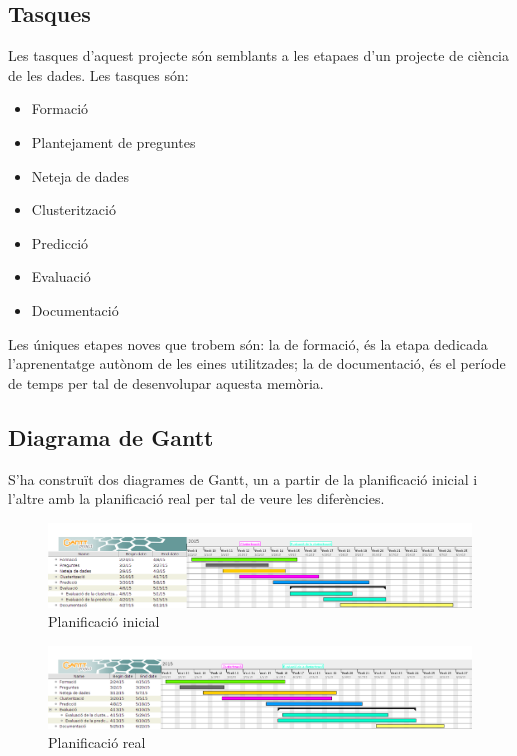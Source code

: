\documentclass[12pt,a4paper,catalan]{article}
\begin{document}
\subsection{Tasques}
Les tasques d'aquest projecte són semblants a les etapaes d'un projecte de ciència de les dades. Les tasques són:
\begin{itemize}[leftmargin=.5in]
	\item Formació
	\item Plantejament de preguntes
	\item Neteja de dades
	\item Clusterització
	\item Predicció
	\item Evaluació
	\item Documentació
\end{itemize}

Les úniques etapes noves que trobem són: la de formació, és la etapa dedicada l'aprenentatge autònom de les eines utilitzades; la de documentació, és el període de temps per tal de desenvolupar aquesta memòria.

\newpage

\subsection{Diagrama de Gantt}
S'ha construït dos diagrames de Gantt, un a partir de la planificació inicial i l'altre amb la planificació real per tal de veure les diferències.

\begin{figure}[h]
\begin{center}
\includegraphics[width=\linewidth]{img/initialplanification.png}
\caption{Planificació inicial}
\end{center}
\end{figure}


\begin{figure}[h]
\begin{center}
\includegraphics[width=\linewidth]{img/realplanification.png}
\caption{Planificació real}
\end{center}
\end{figure}
\end{document}
